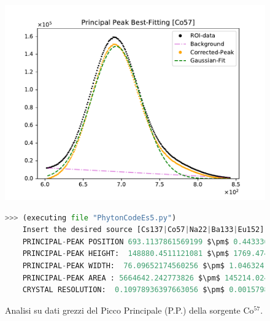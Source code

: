 \begin{figure}[h!]
	\centering
	\caption{Analisi su dati grezzi del Picco Principale (P.P.) della sorgente Co$^{57}$. }
	\includegraphics[width =  \textwidth,trim={1cm 0 1cm 0}, clip]{Immagini/Peak-Fitting_Co57_RAW.pdf}
	\label{fig:PPRawCo57} \bigskip\bigskip
	\begin{lstlisting}[language=python, style=Pystyle, mathescape=true]
	>>> (executing file "PhytonCodeEs5.py")
	Insert the desired source [Cs137|Co57|Na22|Ba133|Eu152]: Co57
	PRINCIPAL-PEAK POSITION 693.1137861569199 $\pm$ 0.4433360809406253
	PRINCIPAL-PEAK HEIGHT:  148880.4511121081 $\pm$ 1769.474256713379
	PRINCIPAL-PEAK WIDTH:  76.09652174560256 $\pm$ 1.04632416144232
	PRINCIPAL-PEAK AREA : 5664642.242773826 $\pm$ 145214.0247096522
	CRYSTAL RESOLUTION:  0.10978936397663056 $\pm$ 0.0015798239331929512
	\end{lstlisting} \bigskip\bigskip
\end{figure}

\newpage


